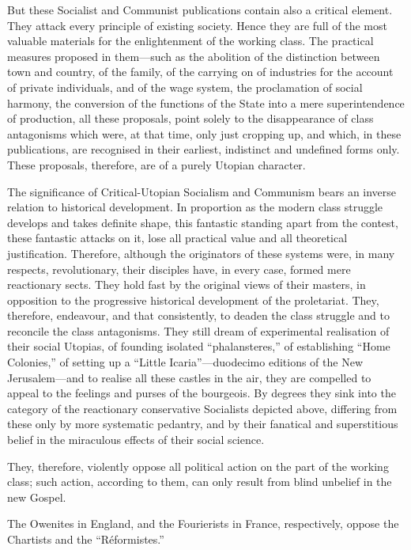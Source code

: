But these Socialist and Communist publications contain also a critical
element. They attack every principle of existing society. Hence they
are full of the most valuable materials for the enlightenment of the
working class. The practical measures proposed in them—such as the
abolition of the distinction between town and country, of the family,
of the carrying on of industries for the account of private
individuals, and of the wage system, the proclamation of social
harmony, the conversion of the functions of the State into a mere
superintendence of production, all these proposals, point solely to the
disappearance of class antagonisms which were, at that time, only just
cropping up, and which, in these publications, are recognised in their
earliest, indistinct and undefined forms only. These proposals,
therefore, are of a purely Utopian character.

The significance of Critical-Utopian Socialism and Communism bears an
inverse relation to historical development. In proportion as the modern
class struggle develops and takes definite shape, this fantastic
standing apart from the contest, these fantastic attacks on it, lose
all practical value and all theoretical justification. Therefore,
although the originators of these systems were, in many respects,
revolutionary, their disciples have, in every case, formed mere
reactionary sects. They hold fast by the original views of their
masters, in opposition to the progressive historical development of the
proletariat. They, therefore, endeavour, and that consistently, to
deaden the class struggle and to reconcile the class antagonisms. They
still dream of experimental realisation of their social Utopias, of
founding isolated “phalansteres,” of establishing “Home Colonies,” of
setting up a “Little Icaria”—duodecimo editions of the New
Jerusalem—and to realise all these castles in the air, they are
compelled to appeal to the feelings and purses of the bourgeois. By
degrees they sink into the category of the reactionary conservative
Socialists depicted above, differing from these only by more systematic
pedantry, and by their fanatical and superstitious belief in the
miraculous effects of their social science.

They, therefore, violently oppose all political action on the part of
the working class; such action, according to them, can only result from
blind unbelief in the new Gospel.

The Owenites in England, and the Fourierists in France, respectively,
oppose the Chartists and the “Réformistes.”




